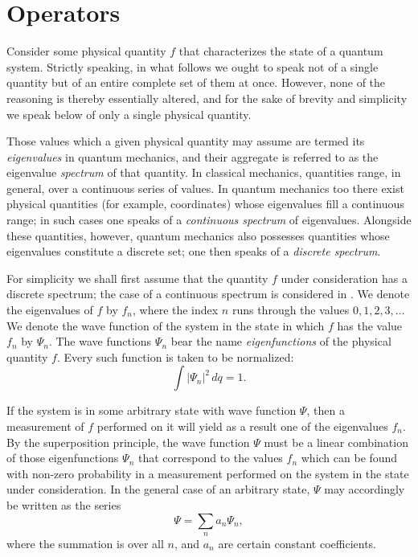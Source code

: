 \section{Operators}

Consider some physical quantity $f$ that characterizes the state of a quantum
system. Strictly speaking, in what follows we ought to speak not of a single
quantity but of an entire complete set of them at once. However, none of the
reasoning is thereby essentially altered, and for the sake of brevity and
simplicity we speak below of only a single physical quantity.

Those values which a given physical quantity may assume are termed its
\emph{eigenvalues} in quantum mechanics, and their aggregate is referred to as
the eigenvalue \emph{spectrum} of that quantity. In classical mechanics,
quantities range, in general, over a continuous series of values. In quantum
mechanics too there exist physical quantities (for example, coordinates) whose
eigenvalues fill a continuous range; in such cases one speaks of a
\emph{continuous spectrum} of eigenvalues. Alongside these quantities, however,
quantum mechanics also possesses quantities whose eigenvalues constitute a
discrete set; one then speaks of a \emph{discrete spectrum}.

For simplicity we shall first assume that the quantity $f$ under consideration
has a discrete spectrum; the case of a continuous spectrum is considered in
. We denote the eigenvalues of $f$ by $f_n$, where the index $n$ runs
through the values $0, 1, 2, 3, \ldots$ We denote the wave function of the
system in the state in which $f$ has the value $f_n$ by $\Psi_n$. The wave
functions $\Psi_n$ bear the name \emph{eigenfunctions} of the physical
quantity $f$. Every such function is taken to be normalized:
\begin{equation}
  \int |\Psi_n|^2\,dq = 1.
  \tag{3.1}
\end{equation}

If the system is in some arbitrary state with wave function $\Psi$, then a
measurement of $f$ performed on it will yield as a result one of the
eigenvalues $f_n$.%
By the superposition principle, the wave
function $\Psi$ must be a linear combination of those eigenfunctions $\Psi_n$
that correspond to the values $f_n$ which can be found with non-zero probability
in a measurement performed on the system in the state under consideration.
In the general case of an arbitrary state, $\Psi$ may accordingly be written as the series
\begin{equation}
  \Psi = \sum_n a_n\Psi_n,
  \tag{3.2}
\end{equation}
where the summation is over all $n$, and $a_n$ are certain constant
coefficients.

